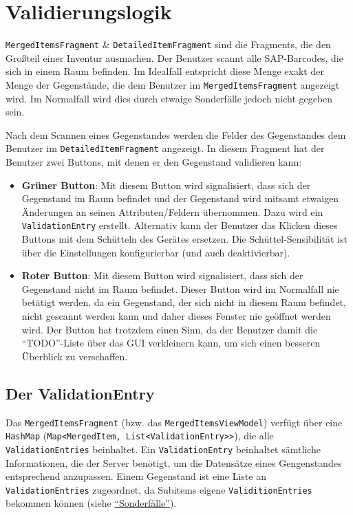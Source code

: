 \hypertarget{validierungslogik}{%
\section{Validierungslogik}\label{validierungslogik}}

\texttt{MergedItemsFragment} \& \texttt{DetailedItemFragment} sind die
Fragments, die den Großteil einer Inventur ausmachen. Der Benutzer
scannt alle SAP-Barcodes, die sich in einem Raum befinden. Im Idealfall
entspricht diese Menge exakt der Menge der Gegenstände, die dem Benutzer
im \texttt{MergedItemsFragment} angezeigt wird. Im Normalfall wird dies
durch etwaige Sonderfälle jedoch nicht gegeben sein.

Nach dem Scannen eines Gegenstandes werden die Felder des Gegenstandes
dem Benutzer im \texttt{DetailedItemFragment} angezeigt. In diesem
Fragment hat der Benutzer zwei Buttons, mit denen er den Gegenstand
validieren kann:

\begin{itemize}
\tightlist
\item
  \textbf{Grüner Button}: Mit diesem Button wird signalisiert, dass sich
  der Gegenstand im Raum befindet und der Gegenstand wird mitsamt
  etwaigen Änderungen an seinen Attributen/Feldern übernommen. Dazu wird
  ein \texttt{ValidationEntry} erstellt. Alternativ kann der Benutzer
  das Klicken dieses Buttons mit dem Schütteln des Gerätes ersetzen. Die
  Schüttel-Sensibilität ist über die Einstellungen konfigurierbar (und
  auch deaktivierbar).
\item
  \textbf{Roter Button}: Mit diesem Button wird signalisiert, dass sich
  der Gegenstand nicht im Raum befindet. Dieser Button wird im
  Normalfall nie betätigt werden, da ein Gegenstand, der sich nicht in
  diesem Raum befindet, nicht gescannt werden kann und daher dieses
  Fenster nie geöffnet werden wird. Der Button hat trotzdem einen Sinn,
  da der Benutzer damit die ``TODO''-Liste über das GUI verkleinern
  kann, um sich einen besseren Überblick zu verschaffen.
\end{itemize}

\hypertarget{der-validationentry}{%
\subsection{Der ValidationEntry}\label{der-validationentry}}

Das \texttt{MergedItemsFragment} (bzw. das
\texttt{MergedItemsViewModel}) verfügt über eine \texttt{HashMap}
(\texttt{Map\textless{}MergedItem,\ List\textless{}ValidationEntry\textgreater{}\textgreater{}}),
die alle \texttt{ValidationEntries} beinhaltet. Ein
\texttt{ValidationEntry} beinhaltet sämtliche Informationen, die der
Server benötigt, um die Datensätze eines Gengenstandes entsprechend
anzupassen. Einem Gegenstand ist eine Liste an
\texttt{ValidationEntries} zugeordnet, da Subitems eigene
\texttt{ValiditionEntries} bekommen können (siehe
\protect\hyperlink{sonderfuxe4lle}{``Sonderfälle''}).


